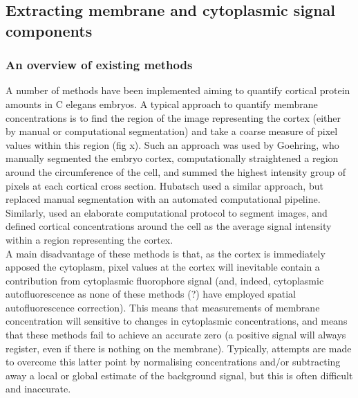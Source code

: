 \documentclass[12pt]{"article"}
\begin{document}
\clearpage
\subsection{Extracting membrane and cytoplasmic signal components}


\subsubsection{An overview of existing methods}

A number of methods have been implemented aiming to quantify cortical protein amounts in C elegans embryos. A typical approach to quantify membrane concentrations is to find the region of the image representing the cortex (either by manual or computational segmentation) and take a coarse measure of pixel values within this region (fig x). Such an approach was used by Goehring, who manually segmented the embryo cortex, computationally straightened a region around the circumference of the cell, and summed the highest intensity group of pixels at each cortical cross section. Hubatsch used a similar approach, but replaced manual segmentation with an automated computational pipeline. Similarly, \textcite{Zhang2017} used an elaborate computational protocol to segment images, and defined cortical concentrations around the cell as the average signal intensity within a region representing the cortex.\\


A main disadvantage of these methods is that, as the cortex is immediately apposed the cytoplasm, pixel values at the cortex will inevitable contain a contribution from cytoplasmic fluorophore signal (and, indeed, cytoplasmic autofluorescence as none of these methods (?) have employed spatial autofluorescence correction). This means that measurements of membrane concentration will sensitive to changes in cytoplasmic concentrations, and means that these methods fail to achieve an accurate zero (a positive signal will always register, even if there is nothing on the membrane). Typically, attempts are made to overcome this latter point by normalising concentrations and/or subtracting away a local or global estimate of the background signal, but this is often difficult and inaccurate.\\
\end{document}
